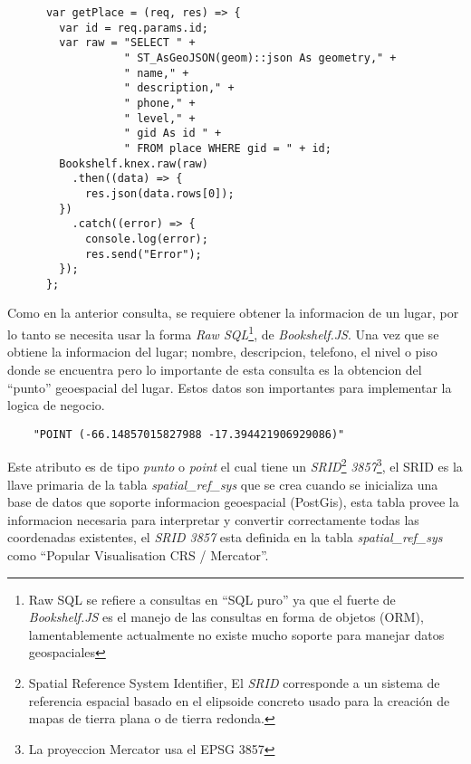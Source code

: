   \begin{center}
    \begin{verbatim}
      var getPlace = (req, res) => {
        var id = req.params.id;
        var raw = "SELECT " +
                  " ST_AsGeoJSON(geom)::json As geometry," +
                  " name," +
                  " description," +
                  " phone," +
                  " level," +
                  " gid As id " +
                  " FROM place WHERE gid = " + id;
        Bookshelf.knex.raw(raw)
          .then((data) => {
            res.json(data.rows[0]);
        })
          .catch((error) => {
            console.log(error);
            res.send("Error");
        });
      };
    \end{verbatim}
  \end{center}

Como en la anterior consulta, se requiere obtener la informacion de un lugar, por lo tanto se necesita  usar la forma \emph{Raw SQL}\footnote{Raw SQL se refiere a consultas en ``SQL puro'' ya que el fuerte de \emph{Bookshelf.JS} es el manejo de las consultas en forma de objetos (ORM), lamentablemente actualmente no existe mucho soporte para manejar datos geospaciales}, de \emph{Bookshelf.JS}.
Una vez que se obtiene la informacion del lugar; nombre, descripcion, telefono, el nivel o piso donde se encuentra pero lo importante de esta consulta es la obtencion del ``punto'' geoespacial del lugar. Estos datos son importantes para implementar la logica de negocio.\\


\begin{center}
  \begin{verbatim}
    "POINT (-66.14857015827988 -17.394421906929086)"
  \end{verbatim}
\end{center}



 Este atributo es de tipo \emph{punto} o \emph{point} el cual tiene un \emph{SRID}\footnote{ Spatial Reference System Identifier, El \emph{SRID} corresponde a un sistema de referencia espacial basado en el elipsoide concreto usado para la creación de mapas de tierra plana o de tierra redonda.\cite{msdn_srid} } \emph{3857}\footnote{La proyeccion Mercator usa el EPSG 3857}, el SRID  es la llave primaria de la tabla \emph{spatial\_ref\_sys} que se crea cuando se inicializa una base de datos que soporte informacion geoespacial (PostGis), esta tabla provee la informacion necesaria para interpretar y convertir correctamente todas las coordenadas existentes, el \emph{SRID 3857} esta definida en la tabla \emph{spatial\_ref\_sys} como ``Popular Visualisation CRS / Mercator''.\\


